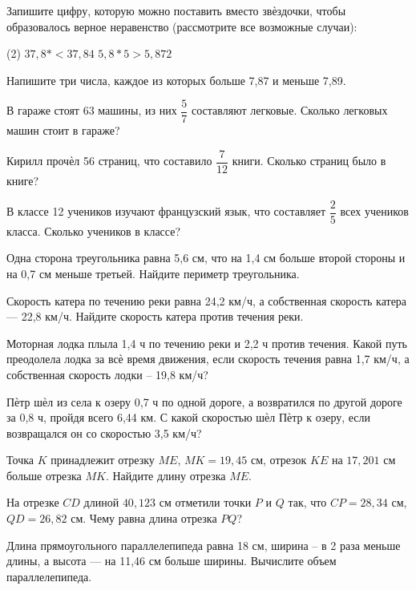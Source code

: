 \begin{class}[number=3]
	\begin{listofex}
		\item Запишите цифру, которую можно поставить вместо звѐздочки, чтобы образовалось
		верное неравенство (рассмотрите все возможные случаи):
		\begin{tasks}(2)
			\task \( 3 7,8* < 3 7,84 \)
			\task \( 5 ,8*5>5 ,872 \)
		\end{tasks}  
		\item Напишите три числа, каждое из которых больше 7,87 и меньше 7,89.
		\item В гараже стоят 63 машины, из них \( \dfrac{5}{7} \) составляют легковые. Сколько легковых машин стоит в гараже?
		\item Кирилл прочѐл 56 страниц, что составило \( \dfrac{7}{12} \) книги. Сколько страниц было в книге?
		\item В классе 12 учеников изучают французский язык, что составляет \( \dfrac{2}{5} \) всех учеников класса. Сколько учеников в классе?
		\item Одна сторона треугольника равна 5,6 см, что на 1,4 см больше второй стороны и на 0,7 см меньше третьей. Найдите периметр треугольника.
		\item Скорость катера по течению реки равна 24,2 км/ч, а собственная скорость катера --- 22,8 км/ч. Найдите скорость катера против течения реки.
		\item Моторная лодка плыла 1,4 ч по течению реки и 2,2 ч против течения. Какой путь преодолела лодка за всѐ время движения, если скорость течения равна 1,7 км/ч, а собственная скорость лодки – 19,8 км/ч?
		\item Пѐтр шѐл из села к озеру 0,7 ч по одной дороге, а возвратился по другой дороге за 0,8 ч, пройдя всего 6,44 км. С какой скоростью шѐл Пѐтр к озеру, если
		возвращался он со скоростью 3,5 км/ч?
		\item Точка \( K \) принадлежит отрезку \( ME \), \( MK = 19,45 \) см, отрезок \( KE \) на \( 17,201 \) см больше отрезка \( MK \). Найдите длину отрезка \( ME \). 
		\item На отрезке \( CD \) длиной \( 40,123 \) см отметили точки \( P \) и \( Q \) так, что \( CP = 28,34 \) см, \( QD =26,82 \) см. Чему равна длина отрезка \( PQ \)?
		\item Длина прямоугольного параллелепипеда равна 18 см, ширина – в 2 раза
		меньше длины, а высота --- на 11,46 см больше ширины. Вычислите объем
		параллелепипеда.

\end{listofex}
\end{class}
